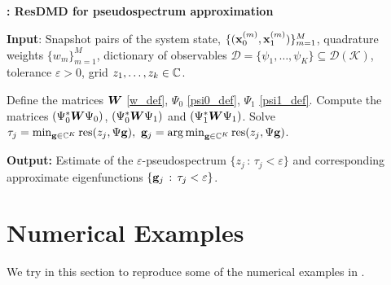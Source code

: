 \begin{algorithm}
\caption{\textbf{: ResDMD for pseudospectrum approximation}}
\label{alg_pseudospectrum}
\textbf{Input}: Snapshot pairs of the system state, $\{(\vb{x}_0^{(m)}, \vb{x}_1^{(m)})\}_{m = 1}^M$, quadrature weights $\{w_m\}_{m = 1}^M$, dictionary of observables $\mathcal{D} = \{\psi_1, \dots, \psi_K\} \subseteq \mathcal{D}(\mathcal{K})$, tolerance $\varepsilon > 0$, grid $z_1, \dots, z_k \in\mathbb{C}$.
\begin{algorithmic}[1]
\State Define the matrices $\vb*{W}$ \eqref{w_def}, $\Psi_0$ \eqref{psi0_def}, $\Psi_1$ \eqref{psi1_def}. 
\State Compute the matrices $(\Psi_0^*\vb*{W}\Psi_0)$, $(\Psi_0^*\vb*{W}\Psi_1)$ and $(\Psi_1^*\vb*{W}\Psi_1)$.
\State Solve $\tau_j = \min_{\vb{g}\in\mathbb{C}^K} \mathrm{res}(z_j, \Psi\vb{g}),\,\, \vb{g}_j = \operatorname*{arg\,min}_{\vb{g}\in\mathbb{C}^K} \mathrm{res}(z_j, \Psi\vb{g})$.
\EndFor
\end{algorithmic}
\textbf{Output:} Estimate of the $\varepsilon$-pseudospectrum $\{z_j\,:\,\tau_j < \varepsilon\}$ and corresponding approximate eigenfunctions $\{\vb{g}_j\,:\,\tau_j < \varepsilon\}$. 
\end{algorithm}

\section{Numerical Examples}
We try in this section to reproduce some of the numerical examples in \cite{colbrook_rigorous_2021}.

